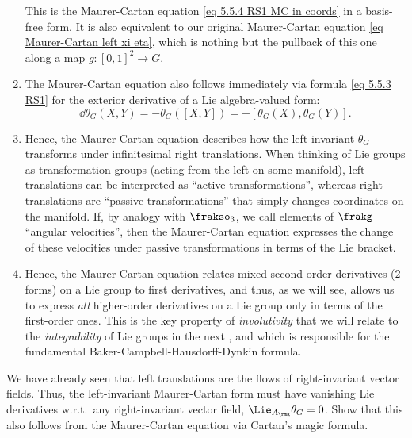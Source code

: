\begin{rem}
\begin{enumerate}
        This is the Maurer-Cartan equation \eqref{eq 5.5.4 RS1 MC in coords} in a basis-free form. It is also equivalent to our original Maurer-Cartan equation \eqref{eq Maurer-Cartan left xi eta}, which is nothing but the pullback of this one along a map $g:[0,1]^2\to G$.
        \item The Maurer-Cartan equation also follows immediately via formula \eqref{eq 5.5.3 RS1} for the exterior derivative of a Lie algebra-valued form:
        \[\dd\theta_G(X,Y)=-\theta_G([X,Y])=-[\theta_G(X),\theta_G(Y)].\]
        \item Hence, the Maurer-Cartan equation describes how the left-invariant $\theta_G$ transforms under infinitesimal right translations. When thinking of Lie groups as transformation groups (acting from the left on some manifold), left translations can be interpreted as ``active transformations'', whereas right translations are ``passive transformations'' that simply changes coordinates on the manifold. If, by analogy with $\frakso_3$, we call elements of $\frakg$ ``angular velocities'', then the Maurer-Cartan equation expresses the change of these velocities under passive transformations in terms of the Lie bracket.
        \item Hence, the Maurer-Cartan equation relates mixed second-order derivatives ($2$-forms) on a Lie group to first derivatives, and thus, as we will see, allows us to express \emph{all} higher-order derivatives on a Lie group only in terms of the first-order ones. This is the key property of \emph{involutivity} that we will relate to the \emph{integrability} of Lie groups in the next \sect, and which is responsible for the fundamental Baker-Campbell-Hausdorff-Dynkin formula.
    \end{enumerate}
\end{rem}

\begin{xca}
    We have already seen that left translations are the flows of right-invariant vector fields. Thus, the left-invariant Maurer-Cartan form must have vanishing Lie derivatives w.r.t.\ any right-invariant vector field, $\Lie_{A_\rmR}\theta_G=0$. Show that this also follows from the Maurer-Cartan equation via Cartan's magic formula.
\end{xca}


